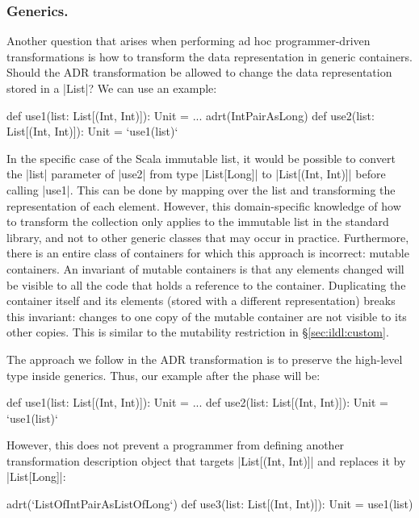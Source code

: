 \subsubsection*{Generics.}
\label{sec:ildl:language-generics}
Another question that arises when performing ad hoc programmer-driven transformations is how to transform the data representation in generic containers. Should the ADR transformation be allowed to change the data representation stored in a |List|? We can use an example:

\begin{lstlisting-nobreak}
def use1(list: List[(Int, Int)]): Unit = ...
adrt(IntPairAsLong) {
  def use2(list: List[(Int, Int)]): Unit = `use1(list)`
}
\end{lstlisting-nobreak}

In the specific case of the Scala immutable list, it would be possible to convert the |list| parameter of |use2| from type |List[Long]| to |List[(Int, Int)]| before calling |use1|. This can be done by mapping over the list and transforming the representation of each element. However, this domain-specific knowledge of how to transform the collection only applies to the immutable list in the standard library, and not to other generic classes that may occur in practice. Furthermore, there is an entire class of containers for which this approach is incorrect: mutable containers. An invariant of mutable containers is that any elements changed will be visible to all the code that holds a reference to the container. Duplicating the container itself and its elements (stored with a different representation) breaks this invariant: changes to one copy of the mutable container are not visible to its other copies. This is similar to the mutability restriction in \S\ref{sec:ildl:custom}.

The approach we follow in the ADR transformation is to preserve the high-level type inside generics. Thus, our example after the \commit{} phase will be:

\begin{lstlisting-nobreak}
def use1(list: List[(Int, Int)]): Unit = ...
def use2(list: List[(Int, Int)]): Unit = `use1(list)`
\end{lstlisting-nobreak}

However, this does not prevent a programmer from defining another transformation description object that targets |List[(Int, Int)]| and replaces it by |List[Long]|:

\begin{lstlisting-nobreak}
adrt(`ListOfIntPairAsListOfLong`) {
  def use3(list: List[(Int, Int)]): Unit = use1(list)
}
\end{lstlisting-nobreak}


